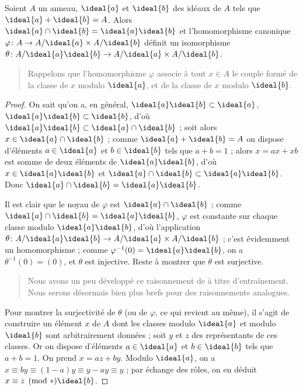 \documentclass[11pt, useosf,
  title in boldface,
  theorem in new line,
  theorem numbering = section,
  number theorems separately,
]{simplivre}
\begin{document}
    \begin{lemma}\label{lem:reste chinois;r=2}
        Soient \( A \) un anneau, \( \ideal{a} \) et \( \ideal{b} \) des idéaux de \( A \) tels que \( \ideal{a}+\ideal{b}=A \). Alors \( \ideal{a} \cap \ideal{b} = \ideal{a}\ideal{b} \) et l'homomorphisme canonique \( \varphi \colon A \to A/\ideal{a} \times A/\ideal{b} \) définit un isomorphisme \( \theta \colon A/\ideal{a}\ideal{b} \to A/\ideal{a} \times A/\ideal{b} \).
    \end{lemma}
    \begin{quote}
        Rappelons que l'homomorphisme \( \varphi \) associe à tout \( x \in A \) le couple formé de la classe de \( x \) modulo \( \ideal{a} \), et de la classe de \( x \) modulo \( \ideal{b} \).
    \end{quote}
    \begin{proof}
        On sait qu'on a, en général, \( \ideal{a}\ideal{b} \subset \ideal{a} \), \( \ideal{a}\ideal{b} \subset \ideal{b} \), d'où \( \ideal{a}\ideal{b} \subset \ideal{a} \cap \ideal{b} \) ; soit alors \( x \in \ideal{a} \cap \ideal{b} \) ; comme \( \ideal{a} + \ideal{b} = A \) on dispose d'éléments \( a \in \ideal{a} \) et \( b \in \ideal{b} \) tels que \( a+b = 1 \) ; alors \( x = ax+xb \) est somme de deux éléments de \( \ideal{a}\ideal{b} \), d'où \( x \in \ideal{a}\ideal{b} \) et \( \ideal{a} \cap \ideal{b} \subset \ideal{a}\ideal{b} \). Donc \( \ideal{a} \cap \ideal{b} = \ideal{a}\ideal{b} \).

        Il est clair que le noyau de \( \varphi \) est \( \ideal{a} \cap \ideal{b} \) ; comme \( \ideal{a} \cap \ideal{b} = \ideal{a}\ideal{b} \), \( \varphi \) est constante sur chaque classe modulo \( \ideal{a}\ideal{b} \), d'où l'application \( \theta \colon A/\ideal{a}\ideal{b} \to A/\ideal{a} \times A/\ideal{b} \) ; c'est évidemment un homomorphisme ; comme \( \varphi^{-1}(0) = \ideal{a}\ideal{b} \), on a \( \theta^{-1}(0) = (0) \), et \( \theta \) est injective. Reste à montrer que \( \theta \) est surjective.

        \begin{quote}
            Nous avons un peu développé ce raisonnement de  à titre d'entraînement. Nous serons désormais bien plus brefs pour des raisonnements analogues.
        \end{quote}

        Pour montrer la surjectivité de \( \theta \) (ou de \( \varphi \), ce qui revient au même), il s'agit de construire un élément \( x \) de \( A \) dont les classes modulo \( \ideal{a} \) et modulo \( \ideal{b} \) sont arbitrairement données ; soit \( y \) et \( z \) des représentants de ces classes. Or on dispose d'éléments \( a \in \ideal{a} \) et \( b \in \ideal{b} \) tels que \( a+b = 1 \). On prend \( x = az+by \). Modulo \( \ideal{a} \), on a \( x \equiv by \equiv (1-a)y \equiv y-ay \equiv y \) ; par échange des rôles, on en déduit \( x \equiv z \pmod*{\ideal{b}} \).
    \end{proof}
\end{document}
